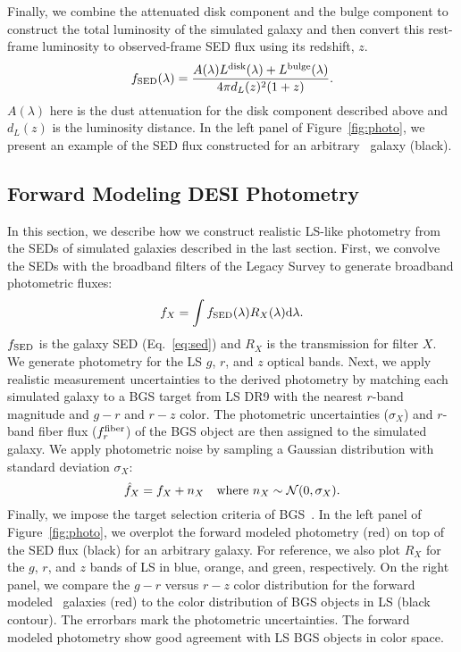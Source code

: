Finally, we combine the attenuated disk component and the bulge component to
construct the total luminosity of the simulated galaxy and then convert this
rest-frame luminosity to observed-frame SED flux using its redshift, $z$.
\begin{equation}\label{eq:sed} 
    f_{\rm SED}(\lambda) = \frac{A(\lambda)L^{\rm disk}(\lambda) + L^{\rm bulge}(\lambda)}{4 \pi d_L(z)^2 (1+z)}.
\end{equation}
$A(\lambda)$ here is the dust attenuation for the disk component described
above and $d_L(z)$ is the luminosity distance.
In the left panel of Figure~\ref{fig:photo}, we present an example of the SED
flux constructed for an arbitrary \lgal~galaxy (black).

\subsection{Forward Modeling DESI Photometry} \label{sec:photo} 
In this section, we describe how we construct realistic LS-like photometry
from the SEDs of simulated galaxies described in the last section.
First, we convolve the SEDs with the broadband filters of the Legacy Survey to
generate broadband photometric fluxes: 
\begin{equation} \label{eq:photo}
    f_X = \int f_{\rm SED}(\lambda) R_X(\lambda) {\rm d}\lambda.
\end{equation}
$f_{\rm SED}$ is the galaxy SED (Eq.~\ref{eq:sed}) and $R_X$ is the
transmission for filter $X$. 
We generate photometry for the LS $g$, $r$, and $z$ optical bands.
Next, we apply realistic measurement uncertainties to the derived photometry by
matching each simulated galaxy to a BGS target from LS DR9 with the nearest
$r$-band magnitude and $g-r$ and $r-z$ color.
The photometric uncertainties ($\sigma_X$) and $r$-band fiber flux ($f_r^{\rm
fiber}$) of the BGS object are then assigned to the simulated galaxy. 
We apply photometric noise by sampling a Gaussian distribution with standard
deviation $\sigma_X$: 
\begin{equation}
    \hat{f}_X = f_X + n_X  \quad {\rm where}~n_X \sim \mathcal{N}(0, \sigma_X).
\end{equation} 
Finally, we impose the target selection criteria of BGS~\citep[][Hahn~\etal~in
prep.]{ruiz-macias2021}.
In the left panel of Figure~\ref{fig:photo}, we overplot the forward
modeled photometry (red) on top of the SED flux (black) for an arbitrary \lgal
galaxy. 
For reference, we also plot $R_X$ for the $g$, $r$, and $z$ bands of LS in
blue, orange, and green, respectively. 
On the right panel, we compare the $g - r$ versus $r - z$ color distribution
for the forward modeled \lgal~galaxies (red) to the color distribution of BGS
objects in LS (black contour). 
The errorbars mark the photometric uncertainties. 
The forward modeled photometry show good agreement with LS BGS objects in
color space.

